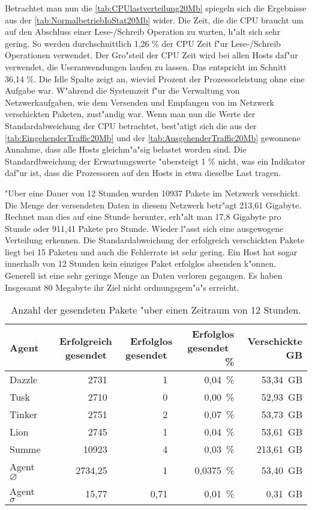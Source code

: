 Betrachtet man nun die \cref{tab:CPUlastverteilung20Mb} spiegeln sich die Ergebnisse aus der \cref{tab:NormalbetriebIoStat20Mb} wider. %
Die Zeit, die die CPU braucht um auf den Abschluss einer Lese-/Schreib Operation zu warten, h"alt sich sehr gering. %
So werden durchschnittlich 1,26 \% der CPU Zeit f"ur Lese-/Schreib Operationen verwendet. Der Gro"steil der CPU Zeit wird %
bei allen Hosts daf"ur verwendet, die Useranwendungen laufen zu lassen. Das entspricht im Schnitt 36,14 \%. Die Idle Spalte zeigt an, wieviel Prozent der Prozessorleistung %
ohne eine Aufgabe war. W"ahrend die Systemzeit f"ur die Verwaltung von Netzwerkaufgaben, wie dem Versenden und Empfangen von %
im Netzwerk verschickten Paketen, zust"andig war. %
Wenn man nun die Werte der Standardabweichung der CPU betrachtet, best"atigt sich die aus der %
\cref{tab:EingehenderTraffic20Mb} und der \cref{tab:AusgehenderTraffic20Mb} gewonnene Annahme, dass alle Hosts gleichm"a"sig belastet worden sind. %
Die Standardbweichung der Erwartungswerte "ubersteigt 1 \% nicht, was ein Indikator daf"ur ist, dass die %
Prozessoren auf den Hosts in etwa dieselbe Last tragen.  

"Uber eine Dauer von 12 Stunden wurden 10937 Pakete im Netzwerk verschickt. Die Menge der versendeten Daten in diesem Netzwerk betr"agt 213,61 Gigabyte. %
Rechnet man dies auf eine Stunde herunter, erh"alt man 17,8 Gigabyte pro Stunde oder 911,41 Pakete pro Stunde. Wieder l"asst sich eine ausgewogene Verteilung erkennen. %
Die Standardabweichung der erfolgreich verschickten Pakete liegt bei 15 Paketen und auch die Fehlerrate ist sehr gering. Ein Host %
hat sogar innerhalb von 12 Stunden kein einziges Paket erfolglos absenden k"onnen. Generell ist eine sehr geringe Menge an Daten verloren %
gegangen. Es haben Insgesamt 80 Megabyte ihr Ziel nicht ordnungsgem"a"s erreicht. %
\begin{table}
\centering
\begin{tabular}{l%
 r<{\,}%
 r<{\,}%
 r<{\,\%}%
 r<{\,GB}%
}
Agent  				& Erfolgreich gesendet			& Erfolglos gesendet			& Erfolglos gesendet	& Verschickte	\\
\hline
Dazzle 				& 2731			 		& 1					& 0,04			& 53,34			\\
Tusk 				& 2710					& 0					& 0,00			& 52,93			\\
Tinker				& 2751					& 2					& 0,07			& 53,73			\\
Lion				& 2745					& 1					& 0,04			& 53,61			\\ 
Summe				& 10923					& 4					& 0,03 			& 213,61		\\
Agent $\diameter $  		& 2734,25				& 1				 	& 0,0375		& 53,40 		\\   
Agent $\sigma $			& 15,77		 			& 0,71					& 0,01      		& 0,31			\\
\end{tabular}
\caption{Anzahl der gesendeten Pakete "uber einen Zeitraum von 12 Stunden.}
\label{tab:VerschickteDaten20Mb}
\end{table}


